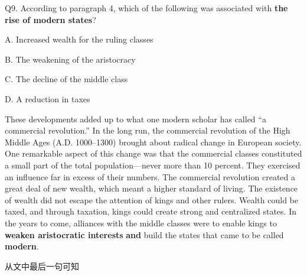 \begin{blk}
    \begin{qst}
        Q9. According to paragraph 4, which of the following was associated with \textbf{the rise of modern states}?
    \end{qst}

    \begin{chc}
        A. Increased wealth for the ruling classes

        B. The weakening of the aristocracy

        C. The decline of the middle class

        D. A reduction in taxes
    \end{chc}

    \begin{psgq}
        These developments added up to what one modern scholar has called “a commercial revolution.” In the long run, the commercial revolution of the High Middle Ages (A.D. 1000–1300) brought about radical change in European society. One remarkable aspect of this change was that the commercial classes constituted a small part of the total population—never more than 10 percent. They exercised an influence far in excess of their numbers. The commercial revolution created a great deal of new wealth, which meant a higher standard of living. The existence of wealth did not escape the attention of kings and other rulers. Wealth could be taxed, and through taxation, kings could create strong and centralized states. In the years to come, alliances with the middle classes were to enable kings to \textbf{weaken aristocratic interests} \textbf{and} build the states that came to be called \textbf{modern}.
    \end{psgq}

    \begin{nlz}
        从文中最后一句可知
    \end{nlz}
\end{blk}

